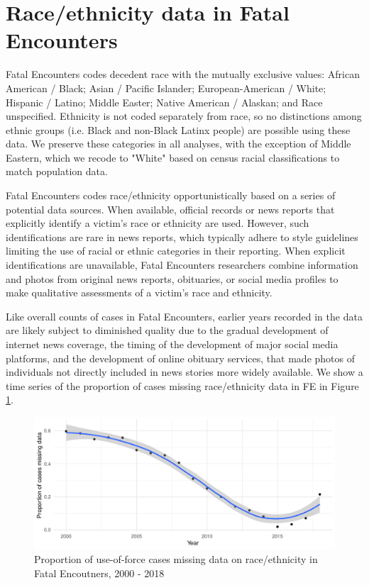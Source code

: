 \documentclass[9pt,twoside,lineno]{pnas-new}
\begin{document}
\section*{Race/ethnicity data in Fatal Encounters}

Fatal Encounters codes decedent race with the mutually exclusive values: African American / Black; Asian / Pacific Islander; European-American / White; Hispanic / Latino; Middle Easter; Native American / Alaskan; and Race unspecified. Ethnicity is not coded separately from race, so no distinctions among ethnic groups (i.e. Black and non-Black Latinx people) are possible using these data. We preserve these categories in all analyses, with the exception of Middle Eastern, which we recode to "White" based on census racial classifications to match population data. 

Fatal Encounters codes race/ethnicity opportunistically based on a series of potential data sources. When available, official records or news reports that explicitly identify a victim's race or ethnicity are used. However, such identifications are rare in news reports, which typically adhere to style guidelines limiting the use of racial or ethnic categories in their reporting. When explicit identifications are unavailable, Fatal Encounters researchers combine information and photos from original news reports, obituaries, or social media profiles to make qualitative assessments of a victim's race and ethnicity. 

Like overall counts of cases in Fatal Encounters, earlier years recorded in the data are likely subject to diminished quality due to the gradual development of internet news coverage, the timing of the development of major social media platforms, and the development of online obituary services, that made photos of individuals not directly included in news stories more widely available. We show a time series of the proportion of cases missing race/ethnicity data in FE in Figure \ref{fig:missing_race_ts}.

\begin{figure}
	\centering
	\includegraphics[width=\linewidth]{vis/prop_missing_race.pdf}
	\caption{Proportion of use-of-force cases missing data on race/ethnicity in Fatal Encoutners, 2000 - 2018}
	\label{fig:missing_race_ts}
\end{figure}
\end{document}
